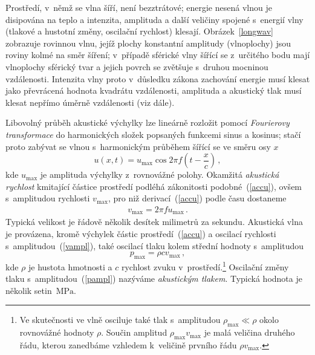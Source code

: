 Prostředí, v~němž se vlna šíří, není bezztrátové; energie nesená vlnou je
disipována na teplo a intenzita, amplituda a další veličiny spojené s~energií
vlny (tlakové a hustotní změny, oscilační rychlost) klesají.
Obrázek~\ref{longwav} zobrazuje rovinnou vlnu, jejíž plochy konstantní
amplitudy (vlnoplochy) jsou roviny kolmé na směr šíření; v~případě sférické
vlny šířící se z~určitého bodu mají vlnoplochy sférický tvar a jejich povrch
se zvětšuje s~druhou mocninou vzdálenosti. Intenzita vlny proto v~důsledku
zákona zachování energie musí klesat jako převrácená hodnota kvadrátu
vzdálenosti, amplituda a akustický tlak musí klesat nepřímo úměrně vzdálenosti
(viz dále).

Libovolný průběh akustické výchylky lze lineárně rozložit pomocí
\emph{Fourierovy transformace} do harmonických složek popsaných funkcemi sinus
a kosinus; stačí proto zabývat se vlnou s~harmonickým průběhem šířící se ve
směru osy $x$
\begin{equation}
  u(x,t) = u_{\mathrm{max}}
    \cos 2\pi f\left(t-\frac{x}{c}\right)\,,                   \label{accu}
\end{equation}
kde $u_{\mathrm{max}}$ je amplituda výchylky z~rovnovážné polohy.  Okamžitá
\emph{akustická rychlost} kmitající částice prostředí podléhá zákonitosti
podobné~(\ref{accu}), ovšem s~amplitudou rychlosti $v_{\mathrm{max}}$, pro niž
derivací~(\ref{accu}) podle času dostaneme
\begin{gather}
  v_{\mathrm{max}} = 2\pi f u_{\mathrm{max}}\,.               \label{vampl}
\end{gather}
Typická velikost je řádově několik desítek milimetrů za sekundu.  Akustická
vlna je provázena, kromě výchylek částic prostředí~(\ref{accu}) a oscilací
rychlosti s~amplitudou~(\ref{vampl}), také oscilací tlaku kolem střední
hodnoty s~amplitudou~\cite{Brd-Sam-Sop:2005:MechKont:3}
\begin{equation}
  p_{\mathrm{max}} = \rho c v_{\mathrm{max}}\,,               \label{pampl}
\end{equation}
kde $\rho$ je hustota hmotnosti a $c$ rychlost zvuku v~prostředí.\footnote{Ve
  skutečnosti ve vlně osciluje také tlak s~amplitudou
  $\rho_{\mathrm{max}}\ll\rho$ okolo rovnovážné hodnoty $\rho$. Součin
  amplitud $\rho_{\mathrm{max}}v_{\mathrm{max}}$ je malá veličina druhého
  řádu, kterou zanedbáme vzhledem k~veličině prvního řádu $\rho
  v_{\mathrm{max}}$.}  Oscilační změny tlaku s~amplitudou~(\ref{pampl})
nazýváme \emph{akustickým tlakem}. Typická hodnota je několik
setin~$\mathrm{MPa}$.

